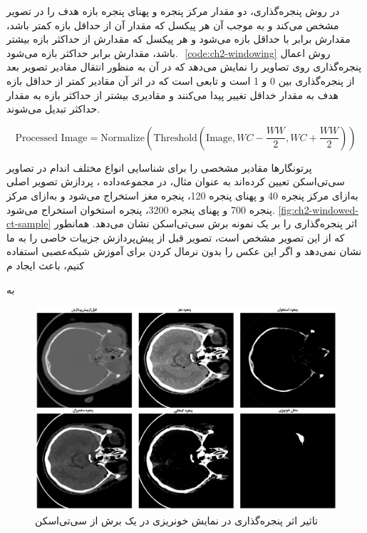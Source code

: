 در روش پنجره‌گذاری، دو مقدار مرکز پنجره
و پهنای پنجره
بازه هدف را در تصویر مشخص می‌کند و به موجب آن هر پیکسل که مقدار آن از حداقل بازه کمتر باشد، مقدارش برابر با حداقل بازه می‌شود و هر پیکسل که مقدارش از حداکثر بازه بیشتر باشد، مقدارش برابر حداکثر بازه می‌شود. ‎
\autoref{code:ch2-windowing}
روش اعمال پنجره‌گذاری روی تصاویر را نمایش می‌دهد که در آن 
به منظور انتقال مقادیر تصویر بعد از پنجره‌گذاری بین 0 و 1 است و 
تابعی است که در اثر آن مقادیر کمتر از حداقل بازه هدف به مقدار خداقل تغییر پیدا می‌کنند و مقادیری بیشتر از حداکثر بازه به مقدار حداکثر تبدیل می‌شوند.   
\begin{latin}
\begin{equation}
\text{Processed Image} = \text{Normalize}(\text{Threshold}(\text{Image}, WC-\frac{WW}{2},WC+\frac{WW}{2})) 
\end{equation}
\label{code:ch2-windowing}
\end{latin}

پرتونگار‌ها مقادیر مشخصی را برای شناسایی انواع مختلف اندام در تصاویر سی‌تی‌اسکن تعیین کرده‌اند به عنوان مثال، در مجموعه‌داده
،
پردازش تصویر اصلی به‌ازای مرکز پنجره 40 و پهنای پنجره 120، پنجره مغز استخراج می‌شود و به‌ازای مرکز پنجره 700 و پهنای پنجره 3200،‌ پنجره استخوان استخراج می‌شود.
\autoref{fig:ch2-windowed-ct-sample}
اثر پنجره‌گذاری را بر یک نمونه برش سی‌تی‌اسکن نشان می‌دهد. همانطور که از این تصویر مشخص است، تصویر قبل از پیش‌پردازش جزییات خاصی را به ما نشان نمی‌دهد و اگر این عکس را بدون نرمال کردن برای آموزش شبکه‌عصبی استفاده کنیم، باعث ایجاد م

 به 


\begin{figure}[h]
\centering
\includegraphics[width=1.0\linewidth]{"Images/Chapter2/Windowed CT"}
\caption{تاثیر اثر پنجره‌گذاری در نمایش خونریزی در یک برش از سی‌تی‌اسکن}
\label{fig:ch2-windowed-ct-sample}
\end{figure}







